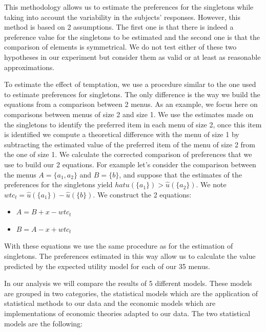 \documentclass[
]{book}
\providecommand{\tightlist}{%
  \setlength{\itemsep}{0pt}\setlength{\parskip}{0pt}}
\begin{document}
This methodology allows us to estimate the preferences for the singletons while
taking into account the variability in the subjects' responses.
However, this method is based on 2 assumptions.
The first one is that there is indeed a preference value for the singletons to
be estimated and the second one is that the comparison of elements is
symmetrical.
We do not test either of these two hypotheses in our experiment but consider
them as valid or at least as reasonable approximations.

To estimate the effect of temptation, we use a procedure similar to the one used
to estimate preferences for singletons.
The only difference is the way we build the equations from a comparison between
2 menus.
As an example, we focus here on comparisons between menus of size 2 and size 1.
We use the estimates made on the singletons to identify the preferred item in
each menu of size 2, once this item is identified we compute a theoretical
difference with the menu of size 1 by subtracting the estimated value of the
preferred item of the menu of size 2 from the one of size 1.
We calculate the corrected comparison of preferences that we use to build our 2
equations.
For example let's consider the comparison between the menus \(A = \{a_1, a_2\}\)
and \(B = \{b\}\), and suppose that the estimates of the preferences for the singletons yield \(hat{u}(\{a_1\}) > \hat{u}(\{a_2\})\).
We note \(wtc_t = \hat{u}(\{a_1\}) - \hat{u}(\{b\})\).
We construct the 2 equations:

\begin{itemize}
\tightlist
\item
  \(A = B + x - wtc_t\)
\item
  \(B = A - x + wtc_t\)
\end{itemize}

With these equations we use the same procedure as for the estimation of
singletons.
The preferences estimated in this way allow us to calculate the value predicted
by the expected utility model for each of our 35 menus.

In our analysis we will compare the results of 5 different models.
These models are grouped in two categories, the statistical models which are the
application of statistical methods to our data and the economic models which are
implementations of economic theories adapted to our data.
The two statistical models are the following:
\end{document}
